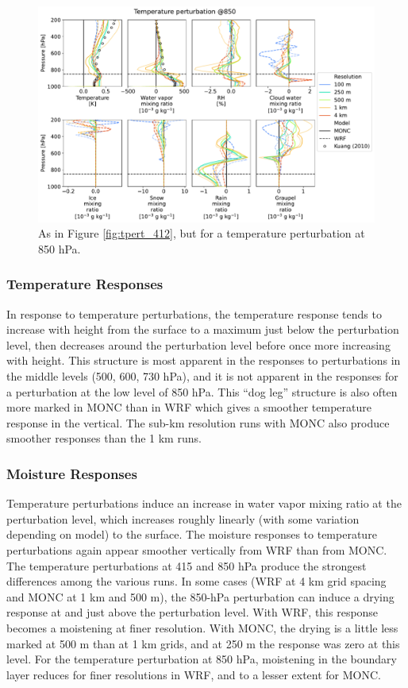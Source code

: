 \documentclass[draft]{agujournal2019}
\begin{document}
\begin{figure}[pth]
    \noindent\includegraphics[width=\textwidth]{figures/pert_diffs_T_0.5_@850}
    \caption{As in Figure \ref{fig:tpert_412}, but for a temperature
    perturbation at 850 hPa.}
    \label{fig:tpert_850}
\end{figure}

\subsubsection{Temperature Responses}

In response to temperature perturbations, the temperature response tends to
increase with height from the surface to a maximum just below the perturbation
level, then decreases around the perturbation level before once more increasing
with height. This structure is most apparent in the responses to perturbations
in the middle levels (500, 600, 730 hPa), and it is not apparent in the
responses for a perturbation at the low level of 850 hPa. This ``dog leg''
structure is also often more marked in MONC than in WRF which gives a smoother
temperature response in the vertical. The sub-km resolution runs with MONC also
produce smoother responses than the 1 km runs.

\subsubsection{Moisture Responses}

Temperature perturbations induce an increase in water vapor mixing ratio at the
perturbation level, which increases roughly linearly (with some variation
depending on model) to the surface. The moisture responses to temperature
perturbations again appear smoother vertically from WRF than from MONC. The
temperature perturbations at 415 and 850 hPa produce the strongest differences
among the various runs. In some cases (WRF at 4 km grid spacing and MONC at 1 km
and 500 m), the 850-hPa perturbation can induce a drying response at and just
above the perturbation level. With WRF, this response becomes a moistening at
finer resolution. With MONC, the drying is a little less marked at 500 m than at
1 km grids, and at 250 m the response was zero at this level. For the
temperature perturbation at 850 hPa, moistening in the boundary layer reduces
for finer resolutions in WRF, and to a lesser extent for MONC. 
\end{document}
